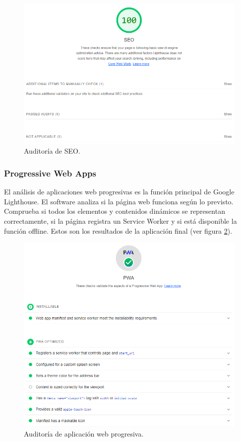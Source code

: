 \documentclass[12pt,twoside,titlepage]{report}
\begin{document}
\begin{figure}[H]
    \centering
    \includegraphics[scale=0.6]{Lighthouse/SEO}
    \caption{Auditoría de SEO.}
    \label{fig:Lighthouse_seo}
\end{figure}

\subsubsection{Progressive Web Apps}

El análisis de aplicaciones web progresivas es la función principal de Google Lighthouse. El software analiza si la página web funciona según lo previsto. Comprueba si todos los elementos y contenidos dinámicos se representan correctamente, si la página registra un Service Worker y si está disponible la función offline. Estos son los resultados de la aplicación final (ver figura \ref{fig:Lighthouse_PWA}).

\begin{figure}[H]
    \centering
    \includegraphics[scale=0.6]{Lighthouse/PWA}
    \caption{Auditoría de aplicación web progresiva.}
    \label{fig:Lighthouse_PWA}
\end{figure}
\end{document}
